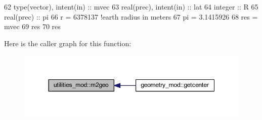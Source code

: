 \begin{DoxyCode}
62     \textcolor{keywordtype}{type}(vector), \textcolor{keywordtype}{intent(in)} :: mvec
63     \textcolor{keywordtype}{real(prec)}, \textcolor{keywordtype}{intent(in)} :: lat
64     \textcolor{keywordtype}{integer} :: R
65     \textcolor{keywordtype}{real(prec)} :: pi
66     r = 6378137 \textcolor{comment}{!earth radius in meters}
67     pi = 3.1415926
68     res = mvec
69     res%
70     res%
\end{DoxyCode}
Here is the caller graph for this function\+:\nopagebreak
\begin{figure}[H]
\begin{center}
\leavevmode
\includegraphics[width=350pt]{namespaceutilities__mod_ac4f9ec7e3dc3683a4e79e462d89a90b9_icgraph}
\end{center}
\end{figure}
